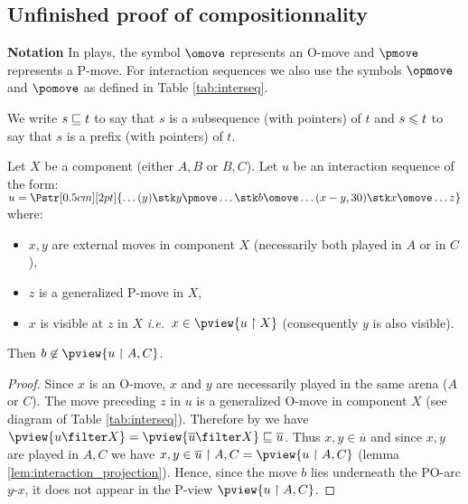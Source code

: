 \subsection{Unfinished proof of compositionnality} 
{\bf Notation} In plays, the symbol $\omove$ represents
an O-move and $\pmove$ represents
a P-move. For interaction sequences we also use
the symbols $\opmove$ and $\pomove$ as defined in Table \ref{tab:interseq}.

We write $s \sqsubseteq t$ to say that $s$ is a subsequence (with pointers) of $t$ and  $s \leqslant t$ to say that $s$ is a prefix (with pointers)
of $t$.



\begin{lemma}
\label{lem:interjump}
Let $X$ be a component (either  $A,B$ or  $B,C$).
Let $u$ be an interaction sequence of the form:
$ u =  
\Pstr[0.5cm][2pt]{ \ldots (y){\stk y \pmove}  \ldots
 {\stk b\omove}  \ldots  (x-y,30){\stk x\omove}
\ldots z}$ where:
\begin{itemize}[-]
\item $x,y$ are external moves in component $X$ (necessarily both played in $A$ or in $C$),
\item  $z$ is a generalized P-move in $X$,
\item  $x$ is visible at $z$ in $X$ \emph{i.e.}~$x\in \pview{u \upharpoonright X}$ (consequently $y$ is also visible).
\end{itemize}
Then $b \not\in \pview{u \upharpoonright A, C}$.
\end{lemma}
\begin{proof}
Since $x$ is an O-move, $x$ and $y$ are necessarily played in the same arena ($A$ or $C$).
The move preceding $z$ in $u$ is a generalized O-move
in component $X$ (see diagram of Table \ref{tab:interseq}).
Therefore by \cite[Lemma 3.3.1]{Harmer2005}
we have $\pview{u \filter X} = \pview{\overline{u} \filter X} \subseqof \overline{u}$.
Thus $x,y \in \overline{u}$ and
since $x,y$ are played in $A,C$ we have 
$x,y  \in \overline{u} \upharpoonright A,C 
= \pview{u \upharpoonright A,C}$ (lemma \ref{lem:interaction_projection}).
Hence, since the move $b$ lies underneath the PO-arc $y$-$x$, 
it does not appear in the P-view  $\pview{u \upharpoonright A,C}$.
\end{proof}



